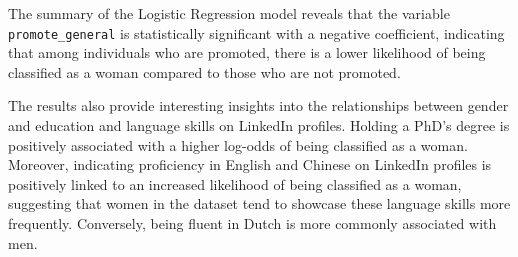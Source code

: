 \documentclass[11pt,]{article}
\newenvironment{Shaded}{\begin{snugshade}}{\end{snugshade}}
\newcommand{\AttributeTok}[1]{\textcolor[rgb]{0.13,0.29,0.53}{#1}}
\newcommand{\CommentTok}[1]{\textcolor[rgb]{0.56,0.35,0.01}{\textit{#1}}}
\newcommand{\DecValTok}[1]{\textcolor[rgb]{0.00,0.00,0.81}{#1}}
\newcommand{\FunctionTok}[1]{\textcolor[rgb]{0.13,0.29,0.53}{\textbf{#1}}}
\newcommand{\NormalTok}[1]{#1}
\newcommand{\OtherTok}[1]{\textcolor[rgb]{0.56,0.35,0.01}{#1}}
\newcommand{\SpecialCharTok}[1]{\textcolor[rgb]{0.81,0.36,0.00}{\textbf{#1}}}
\newcommand{\StringTok}[1]{\textcolor[rgb]{0.31,0.60,0.02}{#1}}
\begin{document}
\begin{Shaded}
\end{Shaded}

The summary of the Logistic Regression model reveals that the variable
\texttt{promote\_general} is statistically significant with a negative
coefficient, indicating that among individuals who are promoted, there
is a lower likelihood of being classified as a woman compared to those
who are not promoted.

The results also provide interesting insights into the relationships
between gender and education and language skills on LinkedIn profiles.
Holding a PhD's degree is positively associated with a higher log-odds
of being classified as a woman. Moreover, indicating proficiency in
English and Chinese on LinkedIn profiles is positively linked to an
increased likelihood of being classified as a woman, suggesting that
women in the dataset tend to showcase these language skills more
frequently. Conversely, being fluent in Dutch is more commonly
associated with men.
\end{document}
